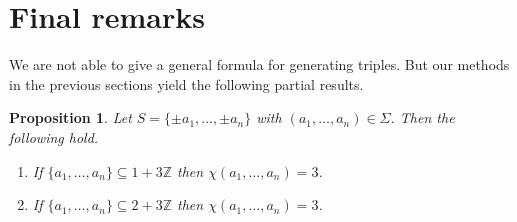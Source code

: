 \documentclass[11pt]{amsart}
\newtheorem{proposition}[theorem]{Proposition}
\theoremstyle{definition}
\def\Z{\mathbb{Z}}
\def\Z{\mathbb{Z}}
\begin{document}
































\section{Final remarks}\label{sec:7}

We are not able to give a general formula for generating triples. But our methods in the previous sections yield the following partial results.

\begin{proposition}\label{prop:4} Let $S=\{\pm a_1,\dots, \pm a_n\}$ with $(a_1,\dots, a_n)\in \Sigma$. Then the following hold.
\begin{enumerate}
\item[(i)] If $\{a_1,\dots, a_n\}\subseteq 1+3\Z$ then $\chi(a_1,\dots, a_n)=3$.
\item[(ii)] If $\{a_1,\dots, a_n\}\subseteq 2+3\Z$ then $\chi(a_1,\dots, a_n)=3$.
\end{enumerate}
\end{proposition}
\end{document}
